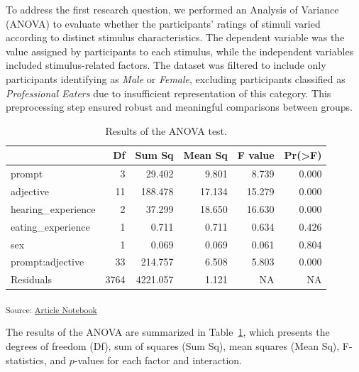 \documentclass[
  letterpaper,
  DIV=11,
  numbers=noendperiod]{scrartcl}
\begin{document}
To address the first research question, we performed an Analysis of
Variance (ANOVA) to evaluate whether the participants' ratings of
stimuli varied according to distinct stimulus characteristics. The
dependent variable was the value assigned by participants to each
stimulus, while the independent variables included stimulus-related
factors. The dataset was filtered to include only participants
identifying as \emph{Male} or \emph{Female}, excluding participants
classified as \emph{Professional Eaters} due to insufficient
representation of this category. This preprocessing step ensured robust
and meaningful comparisons between groups.

\begin{longtable}[]{@{}lrrrrr@{}}

\caption{\label{tbl-anova-value}Results of the ANOVA test.}

\tabularnewline

\toprule\noalign{}
& Df & Sum Sq & Mean Sq & F value & Pr(\textgreater F) \\
\midrule\noalign{}
\endhead
\bottomrule\noalign{}
\endlastfoot
prompt & 3 & 29.402 & 9.801 & 8.739 & 0.000 \\
adjective & 11 & 188.478 & 17.134 & 15.279 & 0.000 \\
hearing\_experience & 2 & 37.299 & 18.650 & 16.630 & 0.000 \\
eating\_experience & 1 & 0.711 & 0.711 & 0.634 & 0.426 \\
sex & 1 & 0.069 & 0.069 & 0.061 & 0.804 \\
prompt:adjective & 33 & 214.757 & 6.508 & 5.803 & 0.000 \\
Residuals & 3764 & 4221.057 & 1.121 & NA & NA \\

\end{longtable}

\textsubscript{Source:
\href{https://matteospanio.github.io/multimodal-symphony-survey-analysis/index.qmd.html}{Article
Notebook}}

The results of the ANOVA are summarized in Table~\ref{tbl-anova-value},
which presents the degrees of freedom (Df), sum of squares (Sum Sq),
mean squares (Mean Sq), F-statistics, and \(p\)-values for each factor
and interaction.
\end{document}
